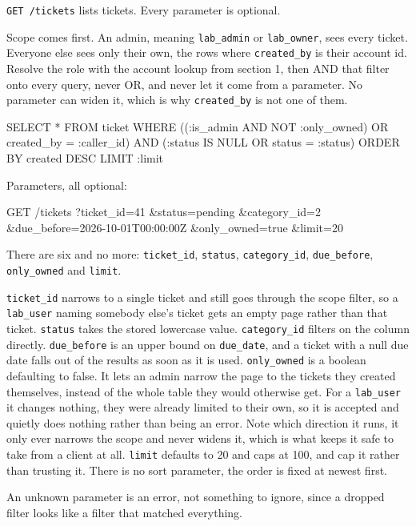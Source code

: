 \documentclass[12pt,letterpaper]{article}
\begin{document}
\texttt{GET /tickets} lists tickets. Every parameter is optional.

Scope comes first. An admin, meaning \texttt{lab\_admin} or
\texttt{lab\_owner}, sees every ticket. Everyone else sees only their own, the
rows where \texttt{created\_by} is their account id. Resolve the role with the
account lookup from section 1, then AND that filter onto every query, never OR,
and never let it come from a parameter. No parameter can widen it, which is why
\texttt{created\_by} is not one of them.

\begin{code}
SELECT * FROM ticket
 WHERE ((:is_admin AND NOT :only_owned)
        OR created_by = :caller_id)
   AND (:status IS NULL OR status = :status)
 ORDER BY created DESC
 LIMIT :limit
\end{code}

Parameters, all optional:

\begin{code}
GET /tickets
  ?ticket_id=41
  &status=pending
  &category_id=2
  &due_before=2026-10-01T00:00:00Z
  &only_owned=true
  &limit=20
\end{code}

There are six and no more: \texttt{ticket\_id}, \texttt{status},
\texttt{category\_id}, \texttt{due\_before}, \texttt{only\_owned} and
\texttt{limit}.

\texttt{ticket\_id} narrows to a single ticket and still goes through the scope
filter, so a \texttt{lab\_user} naming somebody else's ticket gets an empty page
rather than that ticket. \texttt{status} takes the stored lowercase value.
\texttt{category\_id} filters on the column directly. \texttt{due\_before} is an
upper bound on \texttt{due\_date}, and a ticket with a null due date falls out
of the results as soon as it is used. \texttt{only\_owned} is a boolean
defaulting to false. It lets an admin narrow the page to the tickets they
created themselves, instead of the whole table they would otherwise get. For a
\texttt{lab\_user} it changes nothing, they were already limited to their own,
so it is accepted and quietly does nothing rather than being an error. Note
which direction it runs, it only ever narrows the scope and never widens it,
which is what keeps it safe to take from a client at all. \texttt{limit}
defaults to 20 and caps at 100, and cap it rather than trusting it. There is no
sort parameter, the order is fixed at newest first.

An unknown parameter is an error, not something to ignore, since a dropped
filter looks like a filter that matched everything.
\end{document}
